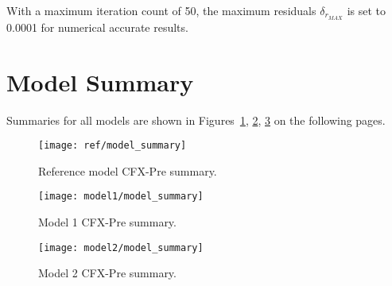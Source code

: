 With a maximum iteration count of 50, the maximum residuals $\delta_{r_{MAX}}$ is set to 0.0001 for numerical accurate results.

\section{Model Summary}
\label{sec:pre_summary}

Summaries for all models are shown in Figures~\ref{fig:ref_modsum}, \ref{fig:mod1_modsum},  \ref{fig:mod2_modsum} on the following pages.

\begin{figure}[H]
	\centering
	\texttt{[image: ref/model\_summary]}
	\caption{Reference model CFX-Pre summary.}
	\label{fig:ref_modsum}
\end{figure}
\begin{figure}[H]
	\centering
	\texttt{[image: model1/model\_summary]}
	\caption{Model 1 CFX-Pre summary.}
	\label{fig:mod1_modsum}
\end{figure}
\begin{figure}[H]
	\centering
	\texttt{[image: model2/model\_summary]}
	\caption{Model 2 CFX-Pre summary.}
	\label{fig:mod2_modsum}
\end{figure}